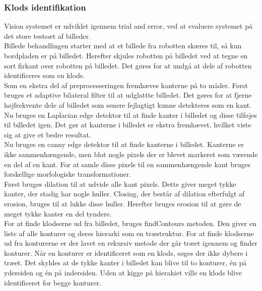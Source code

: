 \subsubsection{Klods identifikation}
Vision systemet er udviklet igennem trial and error, ved at evaluere systemet på det store testsæt af billeder. \\

Billede behandlingen starter med at et billede fra robotten skæres til, så kun bordpladen er på billedet.
Herefter skjules robotten på billedet ved at tegne en sort firkant over robotten på billedet.
Det gøres for at undgå at dele af robotten identificeres som en klods.\\
Som en ekstra del af preprocesseringen fremhæves kanterne på to måder.
Først bruges et adaptive bilateral filter til at udglattte billedet.
Det gøres for at fjerne højfrekvente dele af billedet som senere fejlagtigt kunne detekteres som en kant.
Nu bruges en Laplacian edge detektor til at finde kanter i billedet og disse tilføjes til billedet igen.
Det gør at kanterne i billedet er ekstra fremhævet, hvilket viste sig at give et bedre resultat.\\

Nu bruges en canny edge detektor til at finde kanterne i billedet.
Kanterne er ikke sammenhængende, men blot nogle pixels der er blevet markeret som værende en del af en kant.
For at samle disse pixels til en sammenhængende kant bruges forskellige morfologiske transformationer. \\
Først bruges dilation til at udvide alle kant pixels.
Dette giver meget tykke kanter, der stadig har nogle huller.
Closing, der består af dilation efterfulgt af erosion, bruges til at lukke disse huller.
Herefter bruges erosion til at gøre de meget tykke kanter en del tyndere. \\

For at finde klodserne ud fra billedet, bruges findContours metoden.
Den giver en liste af alle konturer og deres hierarki som en træstruktur.
For at finde klodserne ud fra konturerne er der lavet en rekursiv metode der går træet igennem og finder konturer.
Når en konturer er identificeret som en klods, søges der ikke dybere i træet.
Det skyldes at de tykke kanter i billedet kan blive til to konturer, én på ydersiden og én på indersiden.
Uden at kigge på hierakiet ville en klods blive identificeret for begge konturer.

